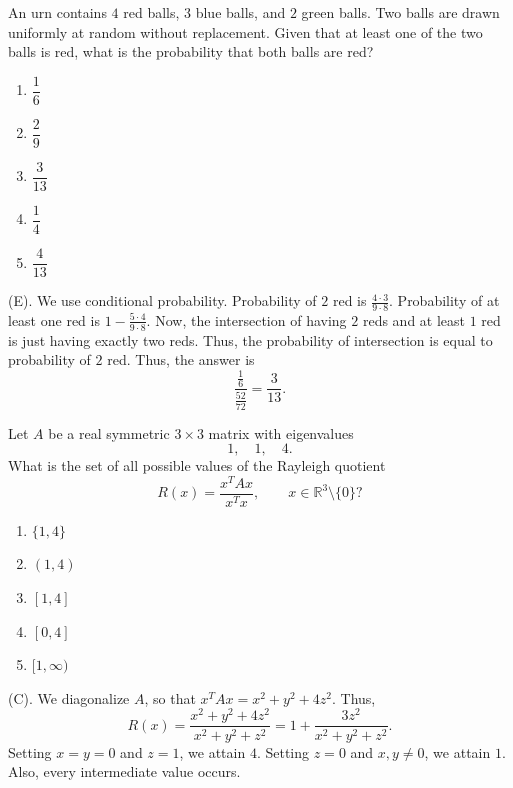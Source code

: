 \begin{exercise}
An urn contains $4$ red balls, $3$ blue balls, and $2$ green balls.
Two balls are drawn uniformly at random without replacement.
Given that at least one of the two balls is red, what is the probability that both balls are red?
\begin{enumerate}[label=(\Alph*)]
    \item $\dfrac16$
    \item $\dfrac29$
    \item $\dfrac3{13}$
    \item $\dfrac14$
    \item $\dfrac4{13}$
\end{enumerate}
\end{exercise}
\begin{solution}
(E). We use conditional probability. Probability of $2$ red is $\frac{4\cdot 3}{9 \cdot 8}$.
Probability of at least one red is $1 - \frac{5\cdot 4}{9\cdot 8}$.
Now, the intersection of having $2$ reds and at least $1$ red is just having exactly two reds.
Thus, the probability of intersection is equal to probability of $2$ red.
Thus, the answer is 
\[
\frac{\frac{1}{6}}{\frac{52}{72}} = \frac{3}{13}.
\]
\end{solution}

\begin{exercise}
Let $A$ be a real symmetric $3\times3$
matrix with eigenvalues
\[
1,\quad 1,\quad 4.
\]
What is the set of all possible values
of the Rayleigh quotient
\[
R(x)=\frac{x^TAx}{x^Tx},
\qquad x\in\mathbb R^3\setminus\{0\}?
\]
\begin{enumerate}[label=(\Alph*)]
    \item $\{1,4\}$
    \item $(1,4)$
    \item $[1,4]$
    \item $[0,4]$
    \item $[1,\infty)$
\end{enumerate}
\end{exercise}
\begin{solution}
(C). We diagonalize $A$, so that $x^TAx = x^2 + y^2 + 4z^2$.
Thus,
\[
R(x) = \frac{x^2 + y^2 + 4z^2}{x^2 + y^2 + z^2} = 1 + \frac{3z^2}{x^2 + y^2 + z^2}.
\]
Setting $x = y = 0$ and $z = 1$, we attain $4$. Setting $z = 0$ and $x,y \neq 0$, we attain $1$.
Also, every intermediate value occurs.
\end{solution}

